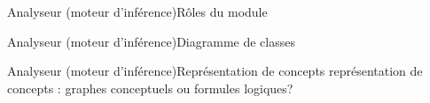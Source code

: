 \begin{frame}{Analyseur (moteur d'inférence)}{Rôles du module}

\end{frame}

\begin{frame}{Analyseur (moteur d'inférence)}{Diagramme de classes}

\end{frame}

\begin{frame}{Analyseur (moteur d'inférence)}{Représentation de concepts}
représentation de concepts : graphes conceptuels ou formules logiques?
\end{frame}